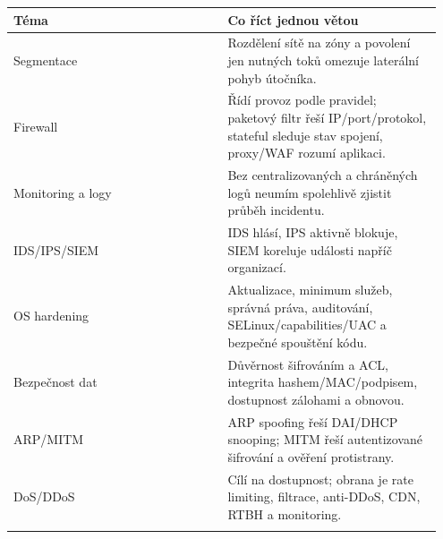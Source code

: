\begin{longtable}{p{0.475\linewidth}p{0.475\linewidth}}
\toprule
\textbf{Téma} & \textbf{Co říct jednou větou} \\
\midrule\endhead
Segmentace & Rozdělení sítě na zóny a povolení jen nutných toků omezuje laterální pohyb útočníka. \\
\addlinespace
Firewall & Řídí provoz podle pravidel; paketový filtr řeší IP/port/protokol, stateful sleduje stav spojení, proxy/WAF rozumí aplikaci. \\
\addlinespace
Monitoring a logy & Bez centralizovaných a chráněných logů neumím spolehlivě zjistit průběh incidentu. \\
\addlinespace
IDS/IPS/SIEM & IDS hlásí, IPS aktivně blokuje, SIEM koreluje události napříč organizací. \\
\addlinespace
OS hardening & Aktualizace, minimum služeb, správná práva, auditování, SELinux/capabilities/UAC a bezpečné spouštění kódu. \\
\addlinespace
Bezpečnost dat & Důvěrnost šifrováním a ACL, integrita hashem/MAC/podpisem, dostupnost zálohami a obnovou. \\
\addlinespace
ARP/MITM & ARP spoofing řeší DAI/DHCP snooping; MITM řeší autentizované šifrování a ověření protistrany. \\
\addlinespace
DoS/DDoS & Cílí na dostupnost; obrana je rate limiting, filtrace, anti-DDoS, CDN, RTBH a monitoring. \\
\addlinespace
\bottomrule
\end{longtable}

\newpage
